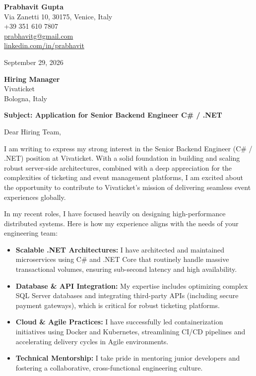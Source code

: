 \documentclass[11pt,a4paper]{article}
\begin{document}
\thispagestyle{empty}

\begin{flushright}
\textbf{Prabhavit Gupta} \\
Via Zanetti 10, 30175, Venice, Italy \\
+39 351 610 7807 \\
\href{mailto:prabhavitg@gmail.com}{prabhavitg@gmail.com} \\
\href{https://www.linkedin.com/in/prabhavit/}{linkedin.com/in/prabhavit} \\
\end{flushright}

\vspace{2em}

September 29, 2026

\textbf{Hiring Manager} \\
Vivaticket \\
Bologna, Italy 

\vspace{1.5em}

\textbf{Subject: Application for Senior Backend Engineer C\# / .NET}

Dear Hiring Team,

I am writing to express my strong interest in the Senior Backend Engineer (C\# / .NET) position at Vivaticket. With a solid foundation in building and scaling robust server-side architectures, combined with a deep appreciation for the complexities of ticketing and event management platforms, I am excited about the opportunity to contribute to Vivaticket's mission of delivering seamless event experiences globally.

In my recent roles, I have focused heavily on designing high-performance distributed systems. Here is how my experience aligns with the needs of your engineering team:

\begin{itemize}
    \item \textbf{Scalable .NET Architectures:} I have architected and maintained microservices using C\# and .NET Core that routinely handle massive transactional volumes, ensuring sub-second latency and high availability.
    \item \textbf{Database \& API Integration:} My expertise includes optimizing complex SQL Server databases and integrating third-party APIs (including secure payment gateways), which is critical for robust ticketing platforms.
    \item \textbf{Cloud \& Agile Practices:} I have successfully led containerization initiatives using Docker and Kubernetes, streamlining CI/CD pipelines and accelerating delivery cycles in Agile environments.
    \item \textbf{Technical Mentorship:} I take pride in mentoring junior developers and fostering a collaborative, cross-functional engineering culture.
\end{itemize}
\end{document}
